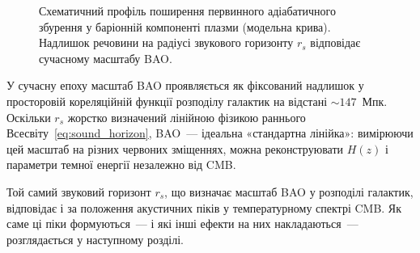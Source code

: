 \documentclass[12pt, a4paper]{article}
\begin{document}
\begin{figure}[b!]
\centering
{}
\caption{Схематичний профіль поширення первинного
  адіабатичного збурення у баріонній компоненті плазми
  (модельна крива). Надлишок речовини на радіусі
  звукового горизонту $r_s$ відповідає сучасному
  масштабу BAO.}
\label{fig:bao_profile}
\end{figure}

У сучасну епоху масштаб BAO проявляється як фіксований
надлишок у просторовій кореляційній функції розподілу
галактик на відстані $\sim 147$~Мпк. Оскільки $r_s$
жорстко визначений лінійною фізикою раннього
Всесвіту~\eqref{eq:sound_horizon}, BAO~--- ідеальна
«стандартна лінійка»: вимірюючи цей масштаб на різних
червоних зміщеннях, можна реконструювати $H(z)$ і
параметри темної енергії незалежно від CMB.

Той самий звуковий горизонт $r_s$, що визначає масштаб
BAO у розподілі галактик, відповідає і за положення
акустичних піків у температурному спектрі CMB. Як саме
ці піки формуються~--- і які інші ефекти на них
накладаються~--- розглядається у наступному розділі.
\end{document}
